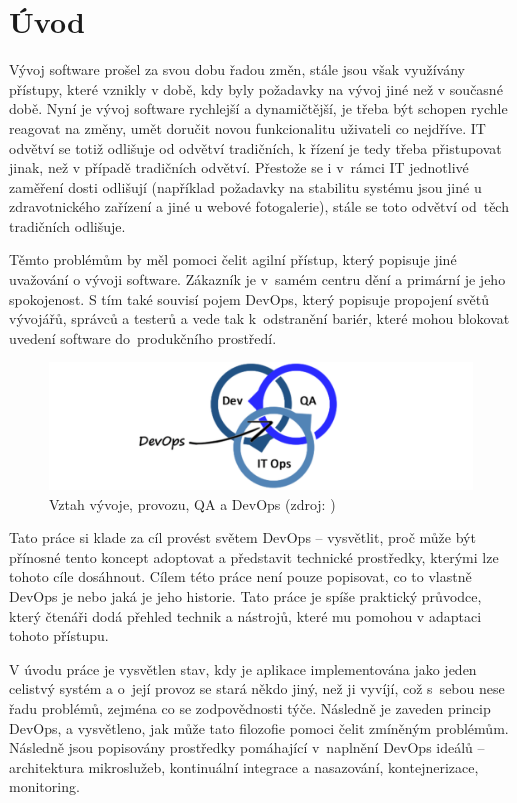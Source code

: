 \documentclass[FM,DP]{tulthesis}
\begin{document}

\chapter{Úvod}

Vývoj software prošel za svou dobu řadou změn, stále jsou však využívány přístupy, které vznikly v době, 
kdy byly požadavky na vývoj jiné než v současné době. Nyní je vývoj software rychlejší a dynamičtější, je třeba
být schopen rychle reagovat na změny, umět doručit novou funkcionalitu uživateli co nejdříve. IT odvětví se
totiž odlišuje od odvětví tradičních, k řízení je tedy třeba přistupovat jinak, než v případě tradičních odvětví.
Přestože se i v~rámci IT jednotlivé zaměření dosti odlišují (například požadavky na stabilitu systému jsou
jiné u zdravotnického zařízení a jiné u webové fotogalerie), stále se toto odvětví od~těch tradičních odlišuje.

Těmto problémům by měl pomoci čelit agilní přístup, který popisuje jiné uvažování o vývoji software. Zákazník 
je v~samém centru dění a primární je jeho spokojenost. S tím také souvisí pojem DevOps, který popisuje propojení 
světů vývojářů, správců a testerů a vede tak k~odstranění bariér, které mohou blokovat uvedení software 
do~produkčního prostředí.

\begin{figure}[h]
\center
\includegraphics[width=\textwidth]{devops.png}
\caption{Vztah vývoje, provozu, QA a DevOps (zdroj: \cite{devops-img})}
\label{devops}
\end{figure}

Tato práce si klade za cíl provést světem DevOps -- vysvětlit, proč může být přínosné tento koncept adoptovat
a představit technické prostředky, kterými lze tohoto cíle dosáhnout. Cílem této práce není pouze popisovat, 
co to vlastně DevOps je nebo jaká je jeho historie. Tato práce je spíše praktický průvodce, který čtenáři dodá 
přehled technik a nástrojů, které mu pomohou v adaptaci tohoto přístupu.

V úvodu práce je vysvětlen stav, kdy je aplikace implementována jako jeden celistvý systém a o~její provoz
se stará někdo jiný, než ji vyvíjí, což s~sebou nese řadu problémů, zejména co se zodpovědnosti
týče. Následně je zaveden princip DevOps, a vysvětleno, jak může tato filozofie pomoci čelit zmíněným problémům. 
Následně jsou popisovány prostředky pomáhající v~naplnění DevOps ideálů -- architektura mikroslužeb, kontinuální 
integrace a nasazování, kontejnerizace, monitoring.
\end{document}
